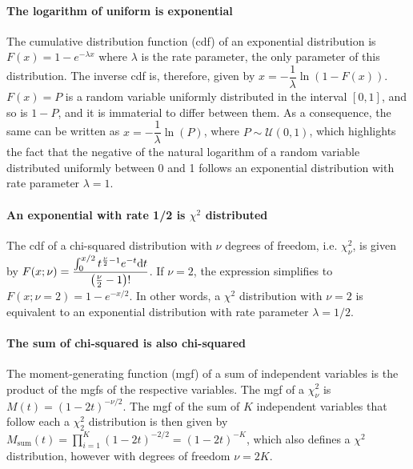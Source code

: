 \paragraph{The logarithm of uniform is exponential} The cumulative distribution function (cdf) of an exponential distribution is $F(x)=1- e^{-\lambda x}$ where $\lambda$ is the rate parameter, the only parameter of this distribution. The inverse cdf is, therefore, given by $x = -\dfrac{1}{\lambda}\ln(1-F(x))$. $F(x)=P$ is a random variable uniformly distributed in the interval $[0, 1]$, and so is $1-P$, and it is immaterial to differ between them. As a consequence, the same can be written as $x = -\dfrac{1}{\lambda}\ln(P)$, where $P \sim \mathcal{U}(0,1)$, which highlights the fact that the negative of the natural logarithm of a random variable distributed uniformly between 0 and 1 follows an exponential distribution with rate parameter $\lambda=1$.

\paragraph{An exponential with rate 1/2 is $\chi^2$ distributed} The cdf of a chi-squared distribution with $\nu$ degrees of freedom, i.e. $\chi^{2}_{\nu}$, is given by $F(x; \nu) = \dfrac{\int_{0}^{x/2} t^{\frac{\nu}{2}-1}e^{-t}{\rm d}t}{\left(\frac{\nu}{2}-1\right)!}$. If $\nu=2$, the expression simplifies to $F(x; \nu=2) = 1-e^{-x/2}$. In other words, a $\chi^{2}$ distribution with $\nu=2$ is equivalent to an exponential distribution with rate parameter $\lambda=1/2$.

\paragraph{The sum of chi-squared is also chi-squared} The moment-generating function (mgf) of a sum of independent variables is the product of the mgfs of the respective variables. The mgf of a $\chi^{2}_{\nu}$ is $M(t) = (1-2t)^{-\nu/2}$. The mgf of the sum of $K$ independent variables that follow each a $\chi^{2}_{2}$ distribution is then given by $M_{\text{sum}}(t) = \prod_{i=1}^{K} (1-2t)^{-2/2} = (1-2t)^{-K}$, which also defines a $\chi^{2}$ distribution, however with degrees of freedom $\nu=2K$.

\vspace{10pt}

